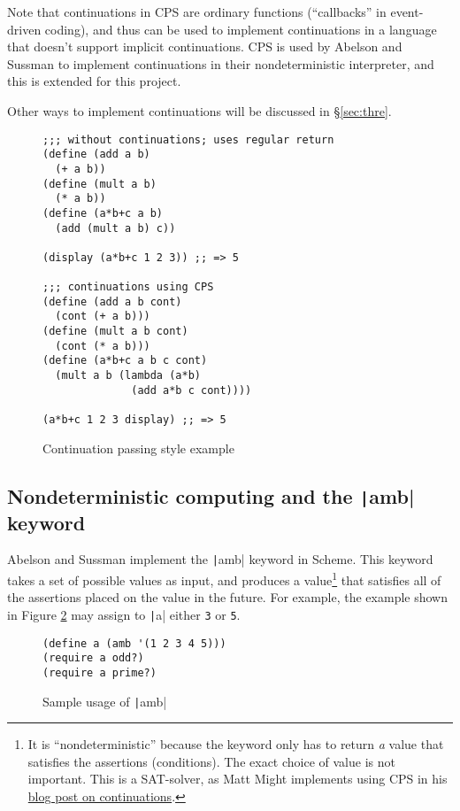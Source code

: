 \documentclass[]{article}
\begin{document}
Note that continuations in CPS are ordinary functions (``callbacks'' in event-driven coding), and thus can be used to implement continuations in a language that doesn't support implicit continuations. CPS is used by Abelson and Sussman to implement continuations in their nondeterministic interpreter, and this is extended for this project.

Other ways to implement continuations will be discussed in \S{\ref{sec:thre}}.

\begin{figure}[]
  \centering
\begin{verbatim}
;;; without continuations; uses regular return
(define (add a b)
  (+ a b))
(define (mult a b)
  (* a b))
(define (a*b+c a b)
  (add (mult a b) c))

(display (a*b+c 1 2 3)) ;; => 5

;;; continuations using CPS
(define (add a b cont)
  (cont (+ a b)))
(define (mult a b cont)
  (cont (* a b)))
(define (a*b+c a b c cont)
  (mult a b (lambda (a*b)
              (add a*b c cont))))

(a*b+c 1 2 3 display) ;; => 5
\end{verbatim}
  \caption{Continuation passing style example}
  \label{fig:cps}
\end{figure}

\subsection{Nondeterministic computing and the \texttt|amb| keyword}
\label{sec:nond}

Abelson and Sussman implement the \texttt|amb| keyword in Scheme. This keyword takes a set of possible values as input, and produces a value\footnote{It is ``nondeterministic'' because the keyword only has to return \textit{a} value that satisfies the assertions (conditions). The exact choice of value is not important. This is a SAT-solver, as Matt Might implements using CPS in his \href{https://matt.might.net/articles/programming-with-continuations--exceptions-backtracking-search-threads-generators-coroutines/}{blog post on continuations}.} that satisfies all of the assertions placed on the value in the future. For example, the example shown in Figure \ref{fig:amb} may assign to \texttt|a| either \texttt{3} or \texttt{5}.

\begin{figure}[]
  \centering
\begin{verbatim}
(define a (amb '(1 2 3 4 5)))
(require a odd?)
(require a prime?)
\end{verbatim}
  \caption{Sample usage of \texttt|amb|}
  \label{fig:amb}
\end{figure}
\end{document}
